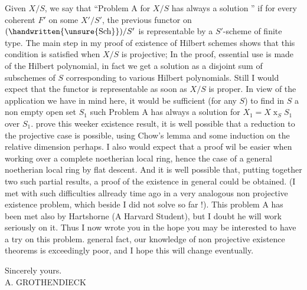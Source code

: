 Given $X/S$, we say that ``Problem A for $X/S$ has always a solution '' if for every coherent $F'$ on some $X'/S'$, the previous functor on $(\handwritten{\unsure{\mathrm{Sch}}})/S'$ is representable by a $S'$-scheme of finite type. The main step in my proof of existence of Hilbert schemes shows that this condition is satisfied when $X/S$ is projective; In the proof, essential use is made of the Hilbert polynomial, in fact we get a solution as a disjoint sum of subschemes of $S$ corresponding to various Hilbert polynomials. Still I would expect that the functor is representable as soon as $X/S$ is proper. In view of the application we have in mind here, it would be sufficient (for any  $S$) to find in $S$ a non empty open set $S_{1}$ such Problem A has always a solution for $X_{1}=X\mathbin{x}_{S}S_{1}$ over $S_{1}$.  prove this weeker existence result, it is well possible that a reduction to the projective case is possible, using Chow's lemma and some induction on the relative dimension perhaps. I also would expect that a proof wil be easier when working over a complete noetherian local ring, hence the case of a general noetherian local ring by flat descent. And it is well possible that, putting together two such partial results, a proof of the existence in general could be obtained. (I met with such difficulties allready time ago in a very analogous non projective existence problem, which beside I did not solve so far !). This problem A has been met also by Hartshorne (A Harvard Student), but I doubt he will work seriously on it. Thus I now wrote you in the hope you may be interested to have a try on this problem.  general fact, our knowledge of non projective existence theorems is exceedingly poor, and I hope this will change eventually.

Sincerely yours.\\

A. GROTHENDIECK\\

